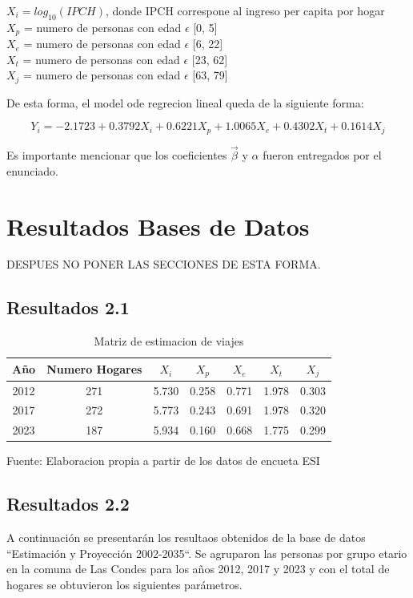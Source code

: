 \documentclass[12pt]{article} %
\begin{document}
\begin{center}
    $X_i = log_{10}(IPCH)$, donde IPCH correspone al ingreso per capita por hogar\\
    $X_p$ = numero de personas con edad $\epsilon$ [0, 5]\\
    $X_e$ = numero de personas con edad $\epsilon$ [6, 22]\\
    $X_t$ = numero de personas con edad $\epsilon$ [23, 62]\\
    $X_j$ = numero de personas con edad $\epsilon$ [63, 79]\\
\end{center}

De esta forma, el model ode regrecion lineal queda de la siguiente forma:

\begin{equation}
    Y_i = -2.1723 + 0.3792X_i + 0.6221X_p + 1.0065X_e + 0.4302X_t + 0.1614X_j
\end{equation}

Es importante mencionar que los coeficientes $\vec{\beta}$ y $\alpha$ fueron entregados por el enunciado.

\section{Resultados Bases de Datos}
DESPUES NO PONER LAS SECCIONES DE ESTA FORMA.

\subsection{Resultados 2.1}

\begin{table}[H]
    \centering
    \begin{tabular}{|c|c|c|c|c|c|c|}
        \hline
        Año & Numero Hogares & $X_i$ & $X_p$ & $X_e$ & $X_t$ & $X_j$ \\
        \hline
        2012 & 271 &5.730 & 0.258 & 0.771 & 1.978 & 0.303 \\
        2017 & 272 &5.773 & 0.243 & 0.691 & 1.978 & 0.320 \\
        2023 & 187 &5.934 & 0.160 & 0.668 & 1.775 & 0.299 \\
        \hline
    \end{tabular}
    \caption{Matriz de estimacion de viajes}
    Fuente: Elaboracion propia a partir de los datos de encueta ESI
\end{table}

\subsection{Resultados 2.2}
A continuación se presentarán los resultaos obtenidos de la base de datos ``Estimación y Proyección 2002-2035``. Se agruparon las personas por grupo etario en la comuna de Las Condes para los años 2012, 2017 y 2023 y con el total de hogares se obtuvieron los siguientes parámetros.
\end{document}
